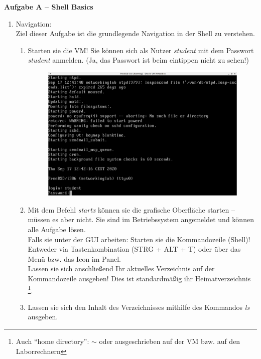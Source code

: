 \documentclass[paper=a4,fontsize=11pt]{scrartcl}%
\numberwithin{equation}{section}
\begin{document}
\begin{center}\Large{\textbf{Aufgabe A -- Shell Basics}}\end{center}\vskip0.25in
\begin{enumerate}
\item Navigation:\\
Ziel dieser Aufgabe ist die grundlegende Navigation in der Shell zu verstehen.
\begin{enumerate}[label=(\alph*)]
		\item Starten sie die VM! Sie können sich als Nutzer \emph{student} mit dem Passwort \emph{student} anmelden. (Ja, das Passwort ist beim eintippen nicht zu sehen!)
		\begin{figure}[h]
		\centering
		\includegraphics[scale=0.3]{freebsd_login}
		\end{figure}
		\item Mit dem Befehl \emph{startx} können sie die grafische Oberfläche starten -- müssen es aber nicht. Sie sind im Betriebssystem angemeldet und können alle Aufgabe lösen.\\
		Falls sie unter der GUI arbeiten: Starten sie die Kommandozeile (Shell)! Entweder via Tastenkombination  (STRG + ALT + T) oder über das Menü bzw. das Icon im Panel.\\
		Lassen sie sich anschließend Ihr aktuelles Verzeichnis auf der Kommandozeile ausgeben! Dies ist standardmäßig ihr Heimatverzeichnis \footnote{Auch \enquote{home directory}: $\sim$ oder ausgeschrieben  auf der VM bzw.  auf den Laborrechnern}.
		\item Lassen sie sich den Inhalt des Verzeichnisses mithilfe des Kommandos \emph{ls} ausgeben.
		

\end{enumerate}
\end{enumerate}
\end{document}
